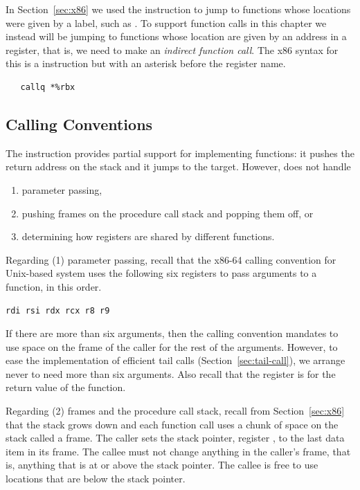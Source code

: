 \documentclass[7x10,nocrop]{TimesAPriori_MIT}%
\begin{document}
In Section~\ref{sec:x86} we used the  instruction to jump
to functions whose locations were given by a label, such as
. To support function calls in this chapter we instead
will be jumping to functions whose location are given by an address in
a register, that is, we need to make an \emph{indirect function
call}. The x86 syntax for this is a  instruction but with
an asterisk before the register name.
\begin{lstlisting}
   callq *%rbx
\end{lstlisting}


\subsection{Calling Conventions}


The  instruction provides partial support for implementing
functions: it pushes the return address on the stack and it jumps to
the target. However,  does not handle
\begin{enumerate}
\item parameter passing,
\item pushing frames on the procedure call stack and popping them off,
  or
\item determining how registers are shared by different functions.
\end{enumerate}

Regarding (1) parameter passing, recall that the x86-64 calling convention
for Unix-based system uses the following six
registers to pass arguments to a function, in this order.
\begin{lstlisting}
rdi rsi rdx rcx r8 r9
\end{lstlisting}
If there are
more than six arguments, then the calling convention mandates to use space on the
frame of the caller for the rest of the arguments. However, to ease
the implementation of efficient tail calls
(Section~\ref{sec:tail-call}), we arrange never to need more than six
arguments.
%
Also recall that the register  is for the return value of
the function.


Regarding (2) frames  and the procedure call
stack,  recall from
Section~\ref{sec:x86} that the stack grows down and each function call
uses a chunk of space on the stack called a frame. The caller sets the
stack pointer, register , to the last data item in its
frame. The callee must not change anything in the caller's frame, that
is, anything that is at or above the stack pointer. The callee is free
to use locations that are below the stack pointer.
\end{document}
